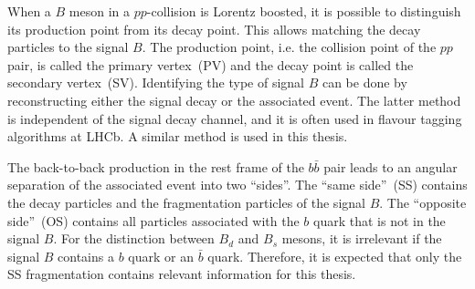 When a $B$ meson in a $pp$-collision is Lorentz boosted, it is possible to distinguish its production point from its decay point.
This allows matching the decay particles to the signal $B$.
The production point, i.e. the collision point of the $pp$ pair, is called the primary vertex~(PV) and the decay point is called the secondary vertex~(SV).
Identifying the type of signal $B$ can be done by reconstructing either the signal decay or the associated event. 
The latter method is independent of the signal decay channel, and it is often used in flavour tagging algorithms at LHCb. 
A similar method is used in this thesis.

The back-to-back production in the rest frame of the $b\bar{b}$ pair leads to an angular separation of the associated event into two \enquote{sides}.
The \enquote{same side}~(SS) contains the decay particles and the fragmentation particles of the signal $B$.
The \enquote{opposite side}~(OS) contains all particles associated with the $b$ quark that is not in the signal $B$.
For the distinction between $B_d$ and $B_s$ mesons, it is irrelevant if the signal $B$ contains a $b$ quark or an $\bar{b}$ quark.
Therefore, it is expected that only the SS fragmentation contains relevant information for this thesis.
